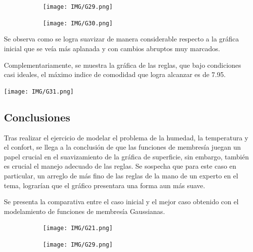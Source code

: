 \documentclass[11pt, letterpaper]{article}
\begin{document}
	
	\begin{figure}[h]
		\centering
		\begin{subfigure}{0.42\textwidth} %
			\centering
			\texttt{[image: IMG/G29.png]}
			\label{fig:G21}
		\end{subfigure}
		\hfill
		\begin{subfigure}{0.42\textwidth} %
			\centering
			\texttt{[image: IMG/G30.png]}
			\label{fig:G22}
		\end{subfigure}
		\label{fig:comparacion3}
	\end{figure}
	
	Se observa como se logra suavizar de manera considerable respecto a la gráfica inicial que se veía más aplanada y con cambios abruptos muy marcados.
	
	\newpage
	
	Complementariamente, se muestra la gráfica de las reglas, que bajo condiciones casi ideales, el máximo indice de comodidad que logra alcanzar es de 7.95.
	
	\texttt{[image: IMG/G31.png]}
	
	\subsection{Conclusiones}
	
	Tras realizar el ejercicio de modelar el problema de la humedad, la temperatura y el confort, se llega a la conclusión de que las funciones de membresía juegan un papel crucial en el suavizamiento de la gráfica de superficie, sin embargo, también es crucial el manejo adecuado de las reglas. Se sospecha que para este caso en particular, un arreglo de más fino de las reglas de la mano de un experto en el tema, lograrían que el gráfico presentara una forma aun más suave.
	
	Se presenta la comparativa entre el caso inicial y el mejor caso obtenido con el modelamiento de funciones de membresía Gaussianas.
	
	\begin{figure}[h]
		\centering
		\begin{subfigure}{0.42\textwidth} %
			\centering
			\texttt{[image: IMG/G21.png]}
			\label{fig:G211}
		\end{subfigure}
		\hfill
		\begin{subfigure}{0.42\textwidth} %
			\centering
			\texttt{[image: IMG/G29.png]}
			\label{fig:G212}
		\end{subfigure}
		\label{fig:comparacion4}
	\end{figure}
	
	
	
	\newpage
	
	
	
	
	
	
	
	
	
\end{document}
